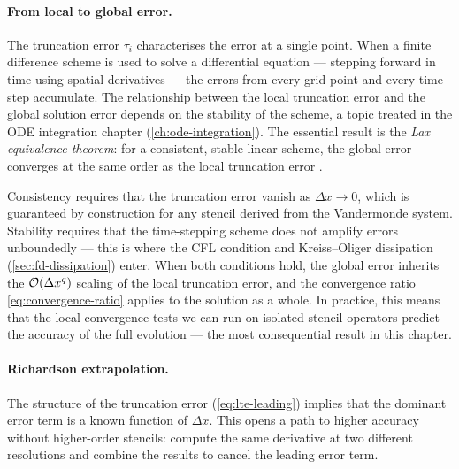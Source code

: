 \paragraph{From local to global error.}

The truncation error $\tau_i$ characterises the error at a single point.
When a finite difference scheme is used to solve a differential equation
--- stepping forward in time using spatial derivatives --- the errors from
every grid point and every time step accumulate.  The relationship between
the local truncation error and the global solution error depends on the
stability of the scheme, a topic treated in the ODE integration chapter
(\cref{ch:ode-integration}).  The essential result is the
\emph{Lax equivalence theorem}: for a consistent, stable linear scheme,
the global error converges at the same order as the local truncation error
\cite{LeVeque2007}.

Consistency requires that the truncation error vanish as $\Delta x \to 0$,
which is guaranteed by construction for any stencil derived from the
Vandermonde system.  Stability requires that the time-stepping scheme does
not amplify errors unboundedly --- this is where the CFL condition and
Kreiss--Oliger dissipation (\cref{sec:fd-dissipation}) enter.  When both
conditions hold, the global error inherits the $\mathcal{O}\!\left(\Delta x^q\right)$
scaling of the local truncation error, and the convergence ratio
\cref{eq:convergence-ratio} applies to the solution as a whole.  In
practice, this means that the local convergence tests we can run on
isolated stencil operators predict the accuracy of the full evolution
--- the most consequential result in this chapter.

\paragraph{Richardson extrapolation.}

The structure of the truncation error (\cref{eq:lte-leading}) implies that
the dominant error term is a known function of $\Delta x$.  This opens a
path to higher accuracy without higher-order stencils: compute the same
derivative at two different resolutions and combine the results to cancel
the leading error term.

